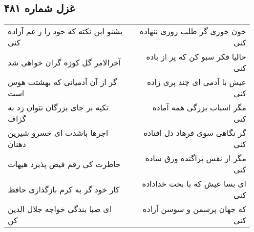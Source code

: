 \begin{center}
\section*{غزل شماره ۴۸۱}
\label{sec:sh481}
\begin{longtable}{l p{0.5cm} r}
بشنو این نکته که خود را ز غم آزاده کنی
&&
خون خوری گر طلب روزی ننهاده کنی
\\
آخرالامر گل کوزه گران خواهی شد
&&
حالیا فکر سبو کن که پر از باده کنی
\\
گر از آن آدمیانی که بهشتت هوس است
&&
عیش با آدمی ای چند پری زاده کنی
\\
تکیه بر جای بزرگان نتوان زد به گزاف
&&
مگر اسباب بزرگی همه آماده کنی
\\
اجرها باشدت ای خسرو شیرین دهنان
&&
گر نگاهی سوی فرهاد دل افتاده کنی
\\
خاطرت کی رقم فیض پذیرد هیهات
&&
مگر از نقش پراگنده ورق ساده کنی
\\
کار خود گر به کرم بازگذاری حافظ
&&
ای بسا عیش که با بخت خداداده کنی
\\
ای صبا بندگی خواجه جلال الدین کن
&&
که جهان پرسمن و سوسن آزاده کنی
\\
\end{longtable}
\end{center}
